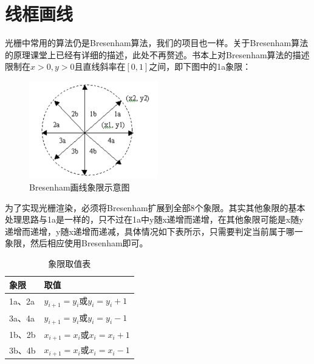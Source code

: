     \section{线框画线}
    \begin{spacing}{2.5}
    光栅中常用的算法仍是Bresenham算法，我们的项目也一样。关于Bresenham算法的原理课堂上已经有详细的描述，此处不再赘述。书本上对Bresenham算法的描述限制在$x > 0, y > 0$且直线斜率在$[0,1]$之间，即下图中的1a象限：
    \begin{figure}[H]
		\centering
		\includegraphics[width=0.5\textwidth]{images/block.png}
		\caption{Bresenham画线象限示意图}
		\label{block}
	\end{figure}
	为了实现光栅渲染，必须将Bresenham扩展到全部8个象限。其实其他象限的基本处理思路与1a是一样的，只不过在1a中y随x递增而递增，在其他象限可能是x随y递增而递增，y随x递增而递减，具体情况如下表所示，只需要判定当前属于哪一象限，然后相应使用Bresenham即可。
	\begin{table}[H]
	\begin{center}
    \begin{tabular}{p{5cm}|p{5cm}}
        \hline
        象限 & 取值\\
        \hline
        1a、2a &  $y_{i+1}=y_{i}$或$y_{i} = y_{i}+1$\\
        \hline
        3a、4a & $y_{i+1}=y_{i}$或$y_{i} = y_{i}-1$\\
        \hline
        1b、2b & $x_{i+1}=x_{i}$或$x_{i} = x_{i}+1$\\
        \hline
        3b、4b & $x_{i+1}=x_{i}$或$x_{i} = x_{i}-1$\\
        \hline
    \end{tabular}
	\end{center}
	\caption{象限取值表}
	\end{table}
    \end{spacing}

